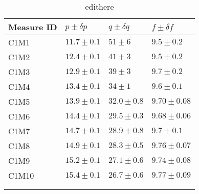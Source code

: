 \begin{longtable}{@{}llll@{}}
\toprule
Measure ID & $p \pm \delta p$ & $q \pm \delta q$ & $f \pm \delta f$ \tabularnewline
\midrule
C1M1 & $11.7 \pm 0.1$ & $51 \pm 6$ & $9.5 \pm 0.2$ \tabularnewline
C1M2 & $12.4 \pm 0.1$ & $41 \pm 3$ & $9.5 \pm 0.2$ \tabularnewline
C1M3 & $12.9 \pm 0.1$ & $39 \pm 3$ & $9.7 \pm 0.2$ \tabularnewline
C1M4 & $13.4 \pm 0.1$ & $34 \pm 1$ & $9.6 \pm 0.1$ \tabularnewline
C1M5 & $13.9 \pm 0.1$ & $32.0 \pm 0.8$ & $9.70 \pm 0.08$ \tabularnewline
C1M6 & $14.4 \pm 0.1$ & $29.5 \pm 0.3$ & $9.68 \pm 0.06$ \tabularnewline
C1M7 & $14.7 \pm 0.1$ & $28.9 \pm 0.8$ & $9.7 \pm 0.1$ \tabularnewline
C1M8 & $14.9 \pm 0.1$ & $28.3 \pm 0.5$ & $9.76 \pm 0.07$ \tabularnewline
C1M9 & $15.2 \pm 0.1$ & $27.1 \pm 0.6$ & $9.74 \pm 0.08$ \tabularnewline
C1M10 & $15.4 \pm 0.1$ & $26.7 \pm 0.6$ & $9.77 \pm 0.09$ \tabularnewline
\bottomrule
\label{tab:edithere}
\\
\caption{edithere}
\end{longtable}
